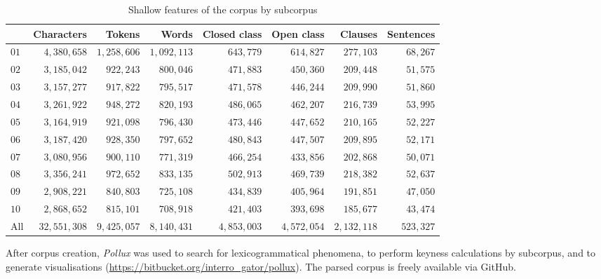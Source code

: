 \documentclass{article}
\begin{document}
\begin{table}[htb]
\centering
\small
\begin{tabular}{lrrrrrrr}
\toprule
{} &  Characters &   Tokens &    Words &  Closed class &  Open class &  Clauses &  Sentences \\
\midrule
$01$ &     $4,380,658$ & $1,258,606$   &  $1,092,113$ &        $643,779$ &      $614,827$ &   $277,103$ &      $68,267$ \\
$02$ &     $3,185,042$ &   $922,243$   &    $800,046$ &        $471,883$ &      $450,360$ &   $209,448$ &      $51,575$ \\
$03$ &     $3,157,277$ &   $917,822$   &    $795,517$ &        $471,578$ &      $446,244$ &   $209,990$ &      $51,860$ \\
$04$ &     $3,261,922$ &   $948,272$   &    $820,193$ &        $486,065$ &      $462,207$ &   $216,739$ &      $53,995$ \\
$05$ &     $3,164,919$ &   $921,098$   &    $796,430$ &        $473,446$ &      $447,652$ &   $210,165$ &      $52,227$ \\
$06$ &     $3,187,420$ &   $928,350$   &    $797,652$ &        $480,843$ &      $447,507$ &   $209,895$ &      $52,171$ \\
$07$ &     $3,080,956$ &   $900,110$   &    $771,319$ &        $466,254$ &      $433,856$ &   $202,868$ &      $50,071$ \\
$08$ &     $3,356,241$ &   $972,652$   &    $833,135$ &        $502,913$ &      $469,739$ &   $218,382$ &      $52,637$ \\
$09$ &     $2,908,221$ &   $840,803$   &    $725,108$ &        $434,839$ &      $405,964$ &   $191,851$ &      $47,050$ \\
$10$ &     $2,868,652$ &   $815,101$   &    $708,918$ &        $421,403$ &      $393,698$ &   $185,677$ &      $43,474$ \\
All &     $32,551,308$ &   $9,425,057$ &    $8,140,431$  &   $4,853,003$ &     $4,572,054$ &   $2,132,118$ & $523,327$ \\
\bottomrule
\end{tabular}
\caption{Shallow features of the corpus by subcorpus}
\label{tab:shallow_P}
\end{table}

After corpus creation, \emph{Pollux} was used to search for lexicogrammatical phenomena, to perform keyness calculations by subcorpus, and to generate visualisations (\url{https://bitbucket.org/interro_gator/pollux}). The parsed corpus is freely available via GitHub. %
\end{document}
